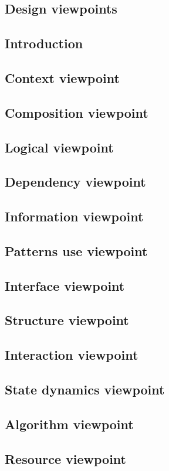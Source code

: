 \documentclass[letterpaper,10pt,draftclsnofoot,onecolumn]{IEEEtran}
\begin{document}
\begin{flushleft}
\section{Design viewpoints }
\subsection{Introduction }
\subsection{Context viewpoint}
\subsection{Composition viewpoint}
\subsection{Logical viewpoint }
\subsection{Dependency viewpoint }
\subsection{Information viewpoint }
\subsection{Patterns use viewpoint }
\subsection{Interface viewpoint }
\subsection{Structure viewpoint}
\subsection{Interaction viewpoint}
\subsection{State dynamics viewpoint }
\subsection{Algorithm viewpoint}
\subsection{Resource viewpoint }
\cite{1}
\clearpage




\end{flushleft}
\end{document}
